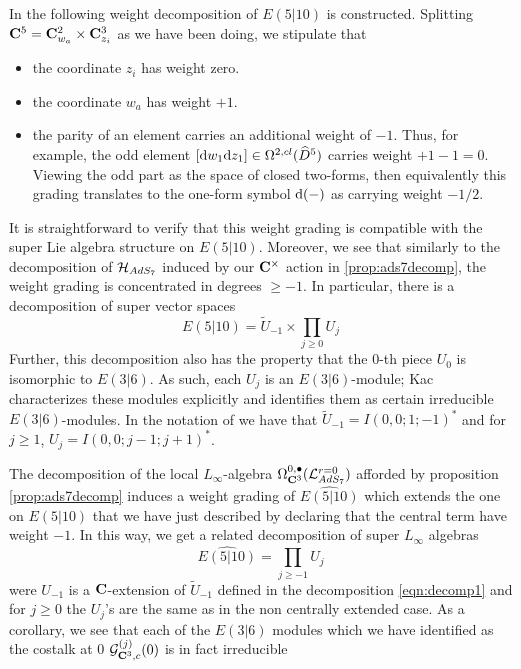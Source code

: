 \documentclass[../main.tex]{subfiles}
\begin{document}
In \cite{KR2} the following weight decomposition of $E(5|10)$ is constructed. Splitting $\mathbf{C}^5 = \mathbf{C}^2_{w_a}\times \mathbf{C}^3_{z_i}$ as we have been doing, we stipulate that
\begin{itemize} 
\item the coordinate $z_i$ has weight zero. 
\item the coordinate $w_a$ has weight $+1$.
\item the parity of an element carries an additional weight of $-1$. 
Thus, for example, the odd element $[\mathrm{d} w_1 \mathrm{d} z_1] \in \Omega^{2,cl}(\widehat{D}^5)$ carries weight $+1 - 1 = 0$. Viewing the odd part as the space of closed two-forms, then equivalently this grading translates to the one-form symbol $\mathrm{d}(-)$ as carrying weight $-1/2$.
\end{itemize} 

It is straightforward to verify that this weight grading is compatible with the super Lie algebra structure on $E(5|10)$. Moreover, we see that similarly to the decomposition of $\mathcal{H}_{AdS_7}$ induced by our $\mathbf{C}^\times$ action in \ref{prop:ads7decomp}, the weight grading is concentrated in degrees $\geq -1$.  In particular, there is a decomposition of super vector spaces
\begin{equation}\label{eqn:decomp1}
E(5|10) = \tilde U_{-1} \times \prod_{j \geq 0} U_j 
\end{equation}
Further, this decomposition also has the property that the 0-th piece $U_0$ is isomorphic to $E(3|6)$. As such, each $U_j$ is an $E(3|6)$-module; Kac characterizes these modules explicitly and identifies them as certain irreducible $E(3|6)$-modules. In the notation of \cite{KR2} we have that $\tilde U_{-1} = I(0,0;1;-1)^*$ and for $j\geq 1$, $U_j = I(0,0;j-1;j+1)^*$. 

The decomposition of the local $L_\infty$-algebra $\Omega^{0,\bullet}_{\mathbf{C}^3}(\mathcal{L}^{r=0}_{AdS_7} )$ afforded by proposition \ref{prop:ads7decomp} induces a weight grading of $\widehat{E(5|10)}$ which extends the one on $E(5|10)$ that we have just described by declaring that the central term have weight $-1$.
In this way, we get a related decomposition of super $L_\infty$ algebras
\begin{equation}\label{eqn:decomp2}
\widehat{E(5|10)} = \prod_{j \geq -1} U_j            
\end{equation}                      
were $U_{-1}$ is a $\mathbf{C}$-extension of $\tilde U_{-1}$ defined in the decomposition \eqref{eqn:decomp1} and for $j \geq 0$ the $U_j$'s are the same as in the non centrally extended case. As a corollary, we see that each of the $E(3|6)$ modules which we have identified as the costalk at 0 $\mathcal{G}^{(j)}_{\mathbf{C}^3, c} (0)$ is in fact irreducible 
\end{document}
